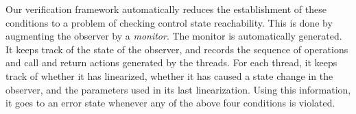 Our verification framework automatically reduces
the establishment of these conditions to 
a problem of checking control state reachability. This is done by
augmenting the observer by a {\em monitor}. The monitor is automatically
generated. It keeps track of 
the state of the observer, and records the sequence of operations and
call and return actions generated by the threads.
For each thread, it keeps track of whether
it has linearized, whether it has caused a state change in the observer, and
the parameters used in its last linearization. Using this information, it
goes to an error state whenever any of the above four conditions is violated.


